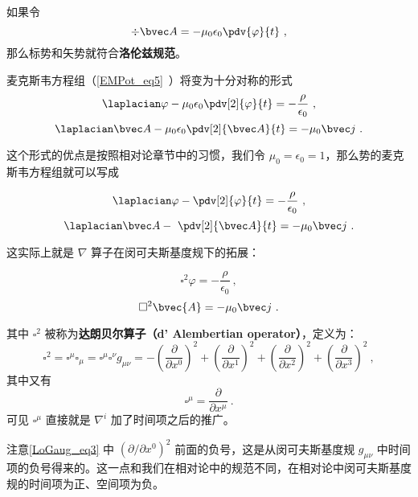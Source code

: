 
\begin{issues}
\issueDraft
\end{issues}


如果令
\begin{equation}
\div \bvec A = -\mu_0 \epsilon_0 \pdv{\varphi}{t}~,
\end{equation}
那么标势和矢势就符合\textbf{洛伦兹规范}。 

麦克斯韦方程组（\autoref{EMPot_eq5}~）将变为十分对称的形式
\begin{equation}\label{LoGaug_eq1}
\laplacian \varphi - \mu_0\epsilon_0 \pdv[2]{\varphi}{t} = -\frac{\rho}{\epsilon_0}~,
\end{equation}
\begin{equation}\label{LoGaug_eq2}
\laplacian \bvec A - \mu_0\epsilon_0 \pdv[2]{\bvec A}{t} = -\mu_0 \bvec j~.
\end{equation}

这个形式的优点是按照相对论章节中的习惯，我们令 $\mu_0=\epsilon_0=1$，那么势的麦克斯韦方程组就可以写成

\begin{equation}
\laplacian \varphi -  \pdv[2]{\varphi}{t} = -\frac{\rho}{\epsilon_0}~,
\end{equation}
\begin{equation}
\laplacian \bvec A - \ \pdv[2]{\bvec A}{t} = -\mu_0 \bvec j~.
\end{equation}

这实际上就是 $\nabla$ 算子在闵可夫斯基度规下的拓展：

\begin{equation}
\square^2 \varphi = -\frac{\rho}{\epsilon_0}~,
\end{equation}
\begin{equation}
\square^2 \bvec{A} = -\mu_0 \bvec j~.
\end{equation}

其中 $\square^2$ 被称为\textbf{达朗贝尔算子（d' Alembertian operator）}，定义为：
\begin{equation}\label{LoGaug_eq3}
\square^2=\square^\mu\square_\mu=\square^\mu\square^\nu g_{\mu\nu}=-(\frac{\partial}{\partial x^0})^2+(\frac{\partial}{\partial x^1})^2+(\frac{\partial}{\partial x^2})^2+(\frac{\partial}{\partial x^3})^2~,
\end{equation}
其中又有
\begin{equation}
\square^\mu=\frac{\partial}{\partial x^\mu}~.
\end{equation}
可见 $\square^\mu$ 直接就是 $\nabla^i$ 加了时间项之后的推广。

注意\autoref{LoGaug_eq3} 中 $(\partial/\partial x^0)^2$ 前面的负号，这是从闵可夫斯基度规 $g_{\mu\nu}$ 中时间项的负号得来的。这一点和我们在相对论中的规范不同，在相对论中闵可夫斯基度规的时间项为正、空间项为负。





